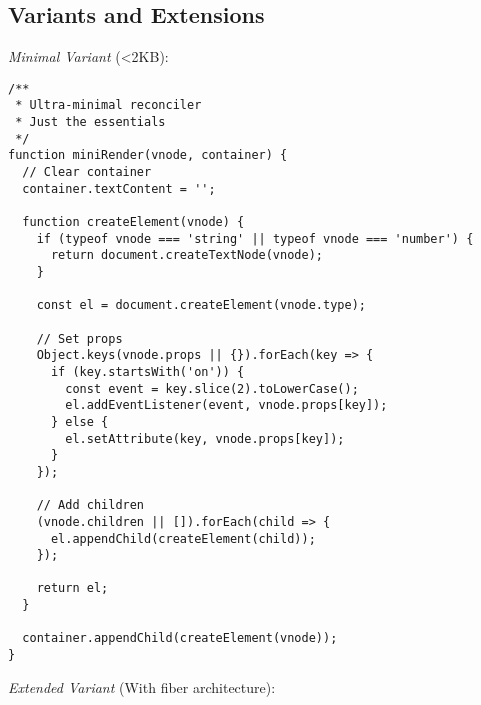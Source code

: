 \documentclass[11pt]{article}
\begin{document}
\subsection{Variants and Extensions}
\label{sec:orgbc430ca}

\emph{Minimal Variant} (<2KB):

\begin{verbatim}
/**
 * Ultra-minimal reconciler
 * Just the essentials
 */
function miniRender(vnode, container) {
  // Clear container
  container.textContent = '';
  
  function createElement(vnode) {
    if (typeof vnode === 'string' || typeof vnode === 'number') {
      return document.createTextNode(vnode);
    }
    
    const el = document.createElement(vnode.type);
    
    // Set props
    Object.keys(vnode.props || {}).forEach(key => {
      if (key.startsWith('on')) {
        const event = key.slice(2).toLowerCase();
        el.addEventListener(event, vnode.props[key]);
      } else {
        el.setAttribute(key, vnode.props[key]);
      }
    });
    
    // Add children
    (vnode.children || []).forEach(child => {
      el.appendChild(createElement(child));
    });
    
    return el;
  }
  
  container.appendChild(createElement(vnode));
}
\end{verbatim}

\emph{Extended Variant} (With fiber architecture):
\end{document}

